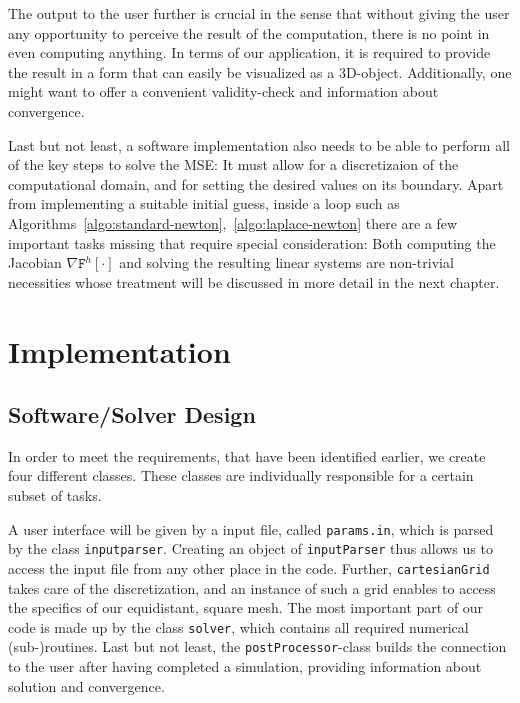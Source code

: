 \documentclass[11pt]{scrartcl}
\newcommand{\mSurfDisc}[1]{\ensuremath{\mathtt{F}^h\left[#1\right]}}
\begin{document}
The output to the user further is crucial in the sense that without giving the user any opportunity to perceive the result of the computation, there is no point in even computing anything. In terms of our application, it is required to provide the result in a form that can easily be visualized as a 3D-object. Additionally, one might want to offer a convenient validity-check and information about convergence.

Last but not least, a software implementation also needs to be able to perform all of the key steps to solve the MSE: It must allow for a discretizaion of the computational domain, and for setting the desired values on its boundary. Apart from implementing a suitable initial guess, inside a loop such as Algorithms~\ref{algo:standard-newton},~\ref{algo:laplace-newton} there are a few important tasks missing that require special consideration: Both computing the Jacobian $\nabla\mSurfDisc{\cdot}$ and solving the resulting linear systems are non-trivial necessities whose treatment will be discussed in more detail in the next chapter. 


\clearpage
\section{Implementation}
\subsection{Software/Solver Design}
In order to meet the requirements, that have been identified earlier, we create four different classes. These classes are individually responsible for a certain subset of tasks. 

A user interface will be given by a input file, called \texttt{params.in}, which is parsed by the class \texttt{inputparser}. Creating an object of \texttt{inputParser} thus allows us to access the input file from any other place in the code. Further, \texttt{cartesianGrid} takes care of the discretization, and an instance of such a grid enables to access the specifics of our equidistant, square mesh. The most important part of our code is made up by the class \texttt{solver}, which contains all required numerical (sub-)routines. Last but not least, the \texttt{postProcessor}-class builds the connection to the user after having completed a simulation, providing information about solution and convergence.
  
\end{document}
